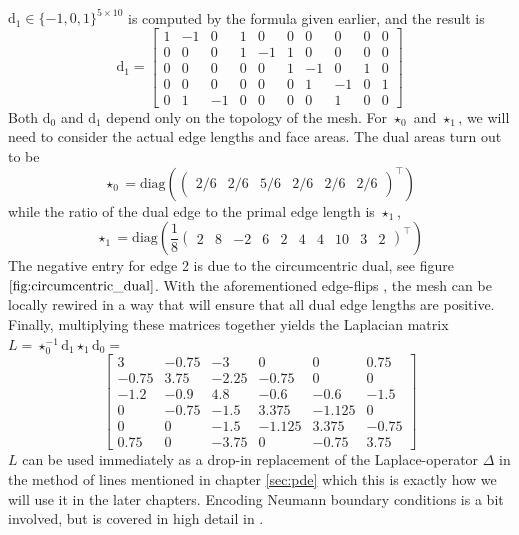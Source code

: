 \\ $\text{d}_1 \in \{-1, 0, 1\}^{5 \times 10}$ is computed by the formula given earlier, and the result is
$$\text{d}_1 = \left[\begin{array}{rrrrrrrrrr}
1 & -1 &  0 &  1 &  0 &  0 &  0 &  0 &  0 &  0
\\ 0 &  0 &  0 &  1 & -1 &  1 &  0 &  0 &  0 &  0
\\ 0 &  0 &  0 &  0 &  0 &  1 & -1 &  0 &  1 &  0
\\ 0 &  0 &  0 &  0 &  0 &  0 &  1 & -1 &  0 &  1
\\ 0 &  1 & -1 &  0 &  0 &  0 &  0 &  1 &  0 &  0
\end{array}\right]$$
Both $\text{d}_0$ and $\text{d}_1$ depend only on the topology of the mesh. For $\star_0$ and $\star_1$, we will need to consider the actual edge lengths and face areas.
The dual areas turn out to be 
$$\star_0 = \text{diag} (\begin{pmatrix}
    2/6 & 2/6 & 5/6 & 2/6 & 2/6 & 2/6 \end{pmatrix}^\top)$$
while the ratio of the dual edge to the primal edge length is $\star_1$,
$$\star_1 = \text{diag} (\frac{1}{8}\begin{pmatrix}
   2 & 8 & -2 & 6 & 2 & 4 & 4 & 10 & 3 & 2 \end{pmatrix}^\top)$$
The negative entry for edge 2 is due to the circumcentric dual, see figure $\ref{fig:circumcentric_dual}$. With the aforementioned edge-flips \cite{sharp2021intrinsic}, the mesh can be locally rewired in a way that will ensure that all dual edge lengths are positive.
\\
Finally, multiplying these matrices together yields the Laplacian matrix $L = \star_0^{-1} \text{d}_1\star_1\text{d}_0 = $
$$\left[\!\!\begin{array}{rrrrrr}
     3   & -0.75 & -3   &  0  &  0  &  0.75 
    \\-0.75 &  3.75 & -2.25 & -0.75 &  0  &  0  
    \\-1.2  & -0.9  &  4.8  & -0.6  & -0.6  & -1.5  
    \\ 0  & -0.75 & -1.5  &  3.375& -1.125&  0  
    \\ 0  &  0  & -1.5  & -1.125&  3.375& -0.75 
    \\ 0.75 &  0  & -3.75 &  0  & -0.75 &  3.75 
\end{array}\!\!\right]$$
$L$ can be used immediately as a drop-in replacement of the Laplace-operator $\Delta$ in the method of lines mentioned in chapter \ref{sec:pde} which this is exactly how we will use it in the later chapters. Encoding Neumann boundary conditions is a bit involved, but is covered in high detail in \cite{craneDDG}.
\ifdefined\COMPILINGFROMMAIN
\else    
    
\fi